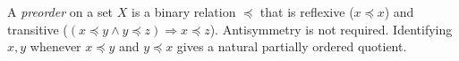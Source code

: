 
A \emph{preorder} on a set $X$ is a binary relation $\preceq$ that is reflexive ($x\preceq x$) and transitive ($(x\preceq y\land y\preceq z)\Rightarrow x\preceq z$). Antisymmetry is not required. Identifying $x,y$ whenever $x\preceq y$ and $y\preceq x$ gives a natural partially ordered quotient.
